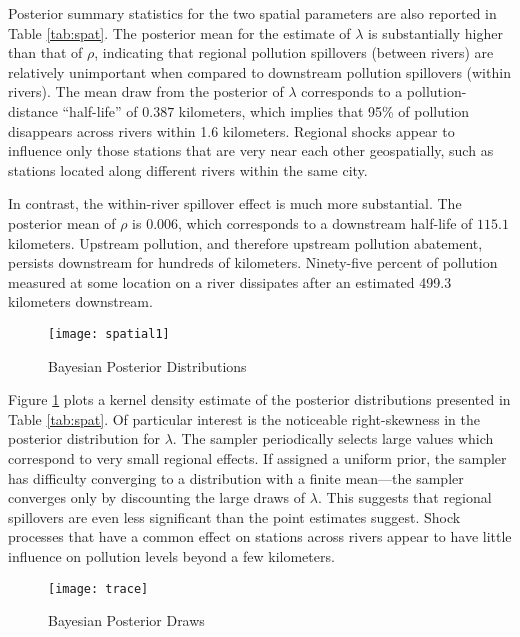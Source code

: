 \documentclass[12pt]{article}
\begin{document}
Posterior summary statistics for the two spatial parameters are also reported in Table \ref{tab:spat}. The posterior mean for the estimate of $\lambda$ is substantially higher than that of $\rho$, indicating that regional pollution spillovers (between rivers) are relatively unimportant when compared to downstream pollution spillovers (within rivers). The mean draw from the posterior of $\lambda$ corresponds to a pollution-distance ``half-life'' of $0.387$ kilometers, which implies that 95\% of pollution disappears across rivers within 1.6 kilometers. Regional shocks appear to influence only those stations that are very near each other geospatially, such as stations located along different rivers within the same city. 

In contrast, the within-river spillover effect is much more substantial. The posterior mean of $\rho$ is $0.006$, which corresponds to a downstream half-life of $115.1$ kilometers. Upstream pollution, and therefore upstream pollution abatement, persists downstream for hundreds of kilometers. Ninety-five percent of pollution measured at some location on a river dissipates after an estimated 499.3 kilometers downstream.

\begin{figure}[t] \centering 
	\texttt{[image: spatial1]}
	\caption{Bayesian Posterior Distributions}
	\label{fig:spatial1}
\end{figure}
	
Figure \ref{fig:spatial1} plots a kernel density estimate of the
posterior distributions presented in Table \ref{tab:spat}. Of
particular interest is the noticeable right-skewness in the posterior
distribution for $\lambda$. The sampler periodically selects large values which correspond to very small regional effects. If assigned a uniform prior, the sampler has difficulty converging to a distribution with a finite mean---the sampler converges only by discounting the large draws of $\lambda$. This suggests that regional spillovers are even less significant than the point estimates suggest. Shock processes that have a common effect on stations across rivers appear to have little influence on pollution levels beyond a few kilometers.


\begin{figure}[t] \centering 
	\texttt{[image: trace]}
	\caption{Bayesian Posterior Draws}
	\label{fig:trace}
\end{figure}
\end{document}
